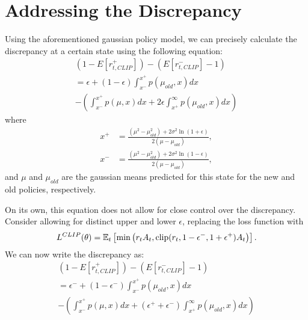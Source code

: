 \documentclass[letterpaper,twocolumn,10pt]{article}
\begin{document}
\section{Addressing the Discrepancy}

Using the aforementioned gaussian policy model, we can precisely calculate the
discrepancy at a certain state using the following equation:
\begin{align*}
    (1 - E[r_{t, CLIP}^{+}]) - (E[r_{t, CLIP}^{-}] - 1)\\
    =
    \epsilon
    + 
    (1 - \epsilon)
    \int_{x^{-}}^{x^{+}}p(\mu_{old}, x)dx
    \\
    -\left(\int_{x^{-}}^{x^{+}}p(\mu, x)dx 
    +2\epsilon
    \int_{x^{+}}^{\infty}p(\mu_{old}, x)dx\right)
\end{align*}
where
\begin{align*}
    x^{+} &=
    \frac{(\mu^2 - \mu_{old}^2)
        + 2\sigma^2\ln\left(1 + \epsilon\right)}
        {2(\mu - \mu_{old})},
\end{align*}
\begin{align*}
    x^{-} &=
    \frac{(\mu^2 - \mu_{old}^2)
        + 2\sigma^2\ln\left(1 - \epsilon\right)}
        {2(\mu - \mu_{old})},
\end{align*}
and $\mu$ and $\mu_{old}$ are the gaussian means predicted for this state for
the new and old policies, respectively.

On its own, this equation does not allow for close control over the
discrepancy. Consider allowing for distinct upper and lower $\epsilon$,
replacing the loss function with
\small
\begin{equation}
    L^{CLIP}(\theta) = \\
    \mathbb{E}_t\left[ 
    \min\left(r_tA_t, \text{clip}
    (r_t, 1 - \epsilon^-, 1 + \epsilon^+)A_t\right)
    \right].
    \label{eq:5}
\end{equation}
\normalsize
We can now write the discrepancy as:
\begin{equation}
    \begin{aligned}
        (1 - E[r_{t, CLIP}^{+}]) - (E[r_{t, CLIP}^{-}] - 1)\\
        =
        \epsilon^-
        + 
        (1 - \epsilon^-)
        \int_{x^{-}}^{x^{+}}p(\mu_{old}, x)dx
        \\
        -\left(\int_{x^{-}}^{x^{+}}p(\mu, x)dx 
        +(\epsilon^+ + \epsilon^-)
        \int_{x^{+}}^{\infty}p(\mu_{old}, x)dx\right)
    \end{aligned}
    \label{eq:6}
\end{equation}
\end{document}
